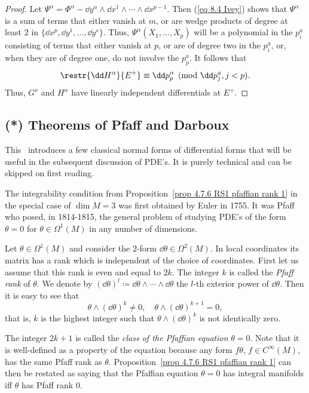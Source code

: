 \begin{proof}
    Let $\Psi^\alpha=\Phi^\alpha-\dd y^\alpha\wedge\dd x^1\wedge\cdots\wedge\dd x^{p-1}$. Then (\ref{eq 8.4 Ivey}) shows that $\Psi^\alpha$ is a sum of terms that either vanish at $m$, or are wedge products of degree at least $2$ in $\{\dd x^p,\dd y^1,\ldots,\dd y^s\}$. Thus, $\Psi^\alpha(X_1,\ldots,X_p)$ will be a polynomial in the $p^a_i$ consisting of terms that either vanish at $p$, or are of degree two in the $p^a_i$, or, when they are of degree one, do not involve the $p^a_p$. It follows that 
    \[\restr{\dd H^\alpha}{E^+}\equiv \dd p^\alpha_p \pmod{\dd p^a_j,j<p}.\]
    Thus, $G^\nu$ and $H^\alpha$ have linearly independent differentials at $E^+$.
\end{proof}











\subsection{(*) Theorems of Pfaff and Darboux}

This \subsect\ introduces a few classical normal forms of differential forms that will be useful in the subsequent discussion of PDE's. It is purely technical and can be skipped on first reading.

The integrability condition from Proposition~\ref{prop 4.7.6 RS1 pfaffian rank 1} in the special case of $\dim M=3$ was first obtained by Euler in 1755. It was Pfaff who posed, in 1814-1815, the general problem of studying PDE's of the form $\theta=0$ for $\theta\in\Omega^1(M)$ in any number of dimensions.

Let $\theta\in\Omega^1(M)$ and consider the $2$-form $\dd\theta\in\Omega^2(M)$. In local coordinates its matrix has a rank which is independent of the choice of coordinates. First let us assume that this rank is even and equal to $2k$. The integer $k$ is called the \emph{Pfaff rank} of $\theta$. We denote by $(\dd\theta)^l\coloneqq \dd\theta\wedge\cdots\wedge\dd\theta$ the $l$-th exterior power of $\dd\theta$. Then it is easy to see that 
\[\theta\wedge(\dd\theta)^{k}\neq 0,\quad \theta\wedge(\dd\theta)^{k+1}=0,\]
that is, $k$ is the highest integer such that $\theta\wedge(\dd\theta)^{k}$ is not identically zero. 

The integer $2k+1$ is called the \emph{class of the Pfaffian equation} $\theta=0$. Note that it is well-defined as a property of the equation because any form $f\theta$, $f\in C^\infty(M)$, has the same Pfaff rank as $\theta$. Proposition~\ref{prop 4.7.6 RS1 pfaffian rank 1} can then be restated as saying that the Pfaffian equation $\theta=0$ has integral manifolds iff $\theta$ has Pfaff rank $0$.

